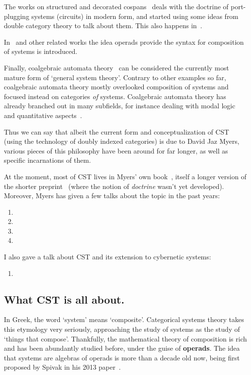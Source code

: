 The works on structured and decorated cospans~\cite{fiadeiro2007structured,fong2015decorated, baez2020open,baez2020structured,Baez2022structuredversus} deals with the doctrine of port-plugging systems (circuits) in modern form, and started using some ideas from double category theory to talk about them.
This also happens in~\cite{lerman2018networks,culbertson2020formal}.

In~\cite{spivak2013operad, libkind2021operadic} and other related works the idea operads provide the syntax for composition of systems is introduced.

Finally, coalgebraic automata theory~\cite{goos_relational_1977,rutten_universal_2000,kupke_coalgebraic_2008,jacobs_introduction_2017} can be considered the currently most mature form of `general system theory'.
Contrary to other examples so far, coalgebraic automata theory mostly overlooked composition of systems and focused instead on categories \emph{of} systems.
Coalgebraic automata theory has already branched out in many subfields, for instance dealing with modal logic~\cite{?} and quantitative aspects~\cite{?}.

Thus we can say that albeit the current form and conceptualization of CST (using the technology of doubly indexed categories) is due to David Jaz Myers, various pieces of this philosophy have been around for far longer, as well as specific incarnations of them.

At the moment, most of CST lives in Myers' own book~\cite{myers_categorical_2022}, itself a longer version of the shorter preprint~\cite{myers_double_2020} (where the notion of \emph{doctrine} wasn't yet developed).
Moreover, Myers has given a few talks about the topic in the past years:
\begin{enumerate}
	\item {}
	\item {}
	\item {}
	\item {}
\end{enumerate}
I also gave a talk about CST and its extension to cybernetic systems:
\begin{enumerate}[resume]
	\item {}
\end{enumerate}

\subsection{What CST is all about.}
In Greek, the word `system' means `composite'. Categorical systems theory takes this etymology very seriously, approaching the study of systems as the study of `things that compose'. Thankfully, the mathematical theory of composition is rich and has been abundantly studied before, under the guise of \textbf{operads}. The idea that systems are algebras of operads is more than a decade old now, being first proposed by Spivak in his 2013 paper~\cite{spivak2013operad}.

